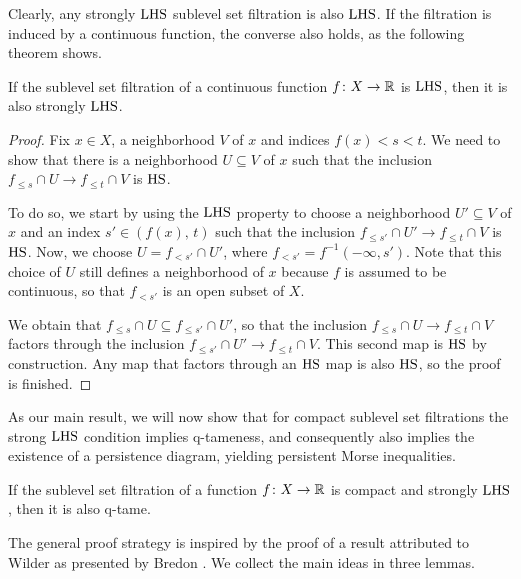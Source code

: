 Clearly, any strongly $\mathrm{LHS}$ sublevel set filtration is also $\mathrm{LHS}$. If the filtration is induced by a continuous function, the converse also holds, as the following theorem shows.

\begin{thm}\label{thm:hlc_to_strong_hlc}
    If the sublevel set filtration of a continuous function $f \colon X \to \mathbb{R}$ is $\mathrm{LHS}$, then it is also strongly $\mathrm{LHS}$.
\end{thm}
\begin{proof}
    Fix $x \in X$, a neighborhood $V$ of $x$ and indices $f(x) < s < t$. We need to show that there is a neighborhood $U \subseteq V$ of $x$ such that the inclusion $f_{\leq s} \cap U \to f_{\leq t} \cap V$ is $\mathrm{HS}$. 
    
    To do so, we start by using the $\mathrm{LHS}$ property to choose a neighborhood $U' \subseteq V$ of $x$ and an index $s' \in (f(x),\, t)$ such that the inclusion $f_{\leq s'} \cap U' \to f_{\leq t} \cap V$ is $\mathrm{HS}$. 
    Now, we choose $U = f_{< s'} \cap U'$, where $f_{< s'} = f^{-1} (-\infty, s')$.
    Note that this choice of $U$ still defines a neighborhood of $x$ because $f$ is assumed to be continuous, so that $f_{< s'}$ is an open subset of $X$.
    
    We obtain that $f_{\leq s} \cap U \subseteq f_{\leq s'} \cap U'$, so that the inclusion $f_{\leq s} \cap U \to f_{\leq t} \cap V$ factors through the inclusion $f_{\leq s'} \cap U' \to f_{\leq t} \cap V$. This second map is $\mathrm{HS}$ by construction. Any map that factors through an $\mathrm{HS}$ map is also $\mathrm{HS}$, so the proof is finished.
\end{proof}


As our main result, we will now show that for compact sublevel set filtrations the strong $\mathrm{LHS}$ condition implies q-tameness, and consequently also implies the existence of a persistence diagram, yielding persistent Morse inequalities.

\begin{thm} \label{t:strong local connectedness implies q-tameness}
	If the sublevel set filtration of a function $f \colon X \to \mathbb{R}$ is compact and strongly $\mathrm{LHS}$, then it is also q-tame.
\end{thm}

The general proof strategy is inspired by the proof of a result attributed to Wilder as presented by Bredon \cite[Section II.17]{Bredon.1997}.
We collect the main ideas in three lemmas.

